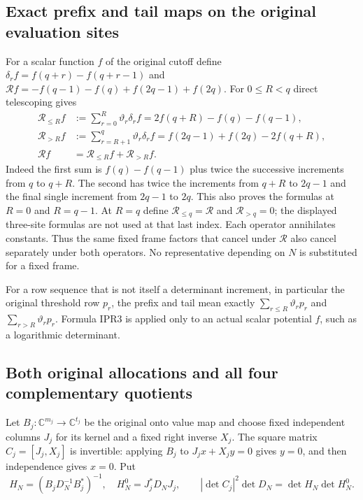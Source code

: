 \documentclass[11pt,a4paper]{article}
\begin{document}
\subsection{Exact prefix and tail maps on the original evaluation sites}
For a scalar function $f$ of the original cutoff define
$\delta_r f=f(q+r)-f(q+r-1)$ and
$\mathcal R f=-f(q-1)-f(q)+f(2q-1)+f(2q)$.
For $0\le R<q$ direct telescoping gives
\[
\begin{aligned}
 \mathcal R_{\le R}f
   &:=\sum_{r=0}^R\vartheta_r\delta_r f
     =2f(q+R)-f(q)-f(q-1),\\
 \mathcal R_{>R}f
   &:=\sum_{r=R+1}^q\vartheta_r\delta_r f
     =f(2q-1)+f(2q)-2f(q+R),\\
 \mathcal R f&=\mathcal R_{\le R}f+\mathcal R_{>R}f.
\end{aligned}                                                       \tag{IPR3}
\]
Indeed the first sum is $f(q)-f(q-1)$ plus twice the
successive increments from $q$ to $q+R$. The second has twice
the increments from $q+R$ to $2q-1$ and the final single increment
from $2q-1$ to $2q$. This also proves the formulas at $R=0$
and $R=q-1$. At $R=q$ define $\mathcal R_{\le q}=\mathcal R$
and $\mathcal R_{>q}=0$; the displayed three-site formulas are
not used at that last index. Each operator annihilates constants.
Thus the same fixed frame factors that cancel under $\mathcal R$
also cancel separately under both operators. No representative
depending on $N$ is substituted for a fixed frame.

For a row sequence that is not itself a determinant increment,
in particular the original threshold row $p_r$, the prefix and
tail mean exactly $\sum_{r\le R}\vartheta_r p_r$ and
$\sum_{r>R}\vartheta_r p_r$. Formula IPR3 is applied only to
an actual scalar potential $f$, such as a logarithmic determinant.

\subsection{Both original allocations and all four complementary quotients}
Let $B_j:\mathbb C^{m_j}\to\mathbb C^{t_j}$ be the original onto
value map and choose fixed independent columns $J_j$ for its kernel
and a fixed right inverse $X_j$. The square matrix $C_j=[J_j,X_j]$
is invertible: applying $B_j$ to $J_jx+X_jy=0$ gives $y=0$, and
then independence gives $x=0$. Put
\[
 H_N=(B_jD_N^{-1}B_j^*)^{-1},\quad
 H^0_N=J_j^*D_NJ_j,\qquad
 |\det C_j|^2\det D_N=\det H_N\det H^0_N .             \tag{IPR4}
\]
\end{document}
